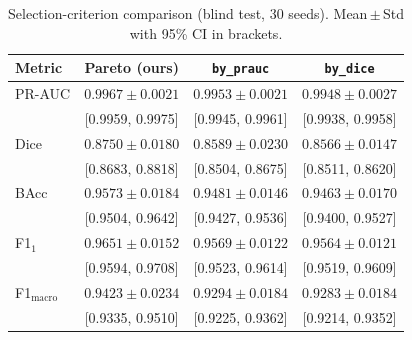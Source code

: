 \documentclass[11pt]{article}
\begin{document}
\begin{table}[h]
  \centering
  \caption{Selection-criterion comparison (blind test, 30 seeds).
           Mean\,$\pm$\,Std with 95\% CI in brackets.}
  \label{tab:scalar}
  \small
  \begin{tabular}{lccc}
    \toprule
    Metric & \textbf{Pareto (ours)} & \texttt{by\_prauc} & \texttt{by\_dice} \\
    \midrule
    PR-AUC & $0.9967\pm0.0021$        & $0.9953\pm0.0021$        & $0.9948\pm0.0027$ \\
           & {\scriptsize[0.9959, 0.9975]} & {\scriptsize[0.9945, 0.9961]} & {\scriptsize[0.9938, 0.9958]} \\
    Dice   & $0.8750\pm0.0180$        & $0.8589\pm0.0230$        & $0.8566\pm0.0147$ \\
           & {\scriptsize[0.8683, 0.8818]} & {\scriptsize[0.8504, 0.8675]} & {\scriptsize[0.8511, 0.8620]} \\
    BAcc   & $0.9573\pm0.0184$        & $0.9481\pm0.0146$        & $0.9463\pm0.0170$ \\
           & {\scriptsize[0.9504, 0.9642]} & {\scriptsize[0.9427, 0.9536]} & {\scriptsize[0.9400, 0.9527]} \\
    F1$_1$ & $0.9651\pm0.0152$        & $0.9569\pm0.0122$        & $0.9564\pm0.0121$ \\
           & {\scriptsize[0.9594, 0.9708]} & {\scriptsize[0.9523, 0.9614]} & {\scriptsize[0.9519, 0.9609]} \\
    F1$_{\text{macro}}$ & $0.9423\pm0.0234$ & $0.9294\pm0.0184$   & $0.9283\pm0.0184$ \\
           & {\scriptsize[0.9335, 0.9510]} & {\scriptsize[0.9225, 0.9362]} & {\scriptsize[0.9214, 0.9352]} \\
    \bottomrule
  \end{tabular}
\end{table}
\end{document}
